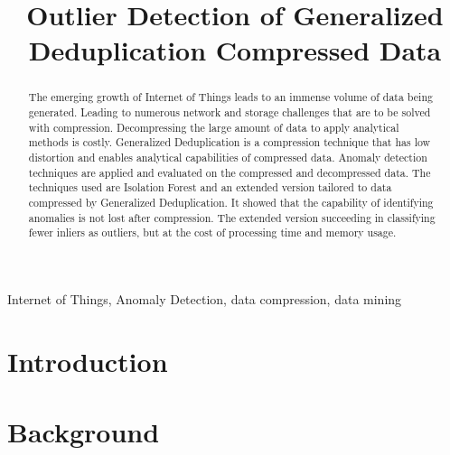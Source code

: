 \documentclass[conference]{IEEEtran}
\begin{document}
\title{Outlier Detection of Generalized Deduplication Compressed Data\\
}

\author{
}

\maketitle
\thispagestyle{plain}
\pagestyle{plain}
\begin{abstract}
  The emerging growth of Internet of Things leads to an immense volume of data being generated. Leading to numerous network and storage challenges that are to be solved with compression. Decompressing the large amount of data to apply analytical methods is costly. Generalized Deduplication is a compression technique that has low distortion and enables analytical capabilities of compressed data. Anomaly detection techniques are applied and evaluated on the compressed and decompressed data. The techniques used are Isolation Forest and an extended version tailored to data compressed by Generalized Deduplication. It showed that the capability of identifying anomalies is not lost after compression. The extended version succeeding in classifying fewer inliers as outliers, but at the cost of processing time and memory usage.       
\end{abstract}

\begin{IEEEkeywords}
  Internet of Things, Anomaly Detection, data compression, data mining
\end{IEEEkeywords}

\section{Introduction}


\section{Background}\label{sec:background}

\end{document}
